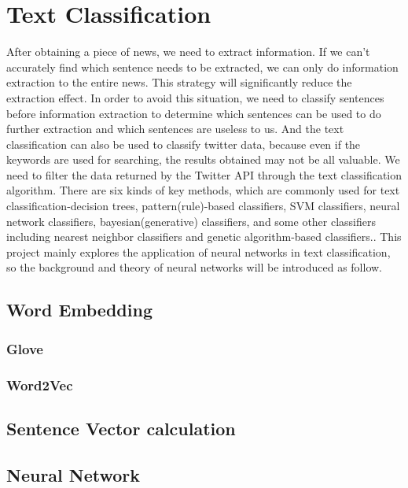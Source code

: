 \section{Text Classification}
\qquad After obtaining a piece of news, we need to extract information. If we can’t accurately find which sentence needs to be extracted, we can only do information extraction to the entire news. This strategy will significantly reduce the extraction effect. In order to avoid this situation, we need to classify sentences before information extraction to determine which sentences can be used to do further extraction and which sentences are useless to us. And the text classification can also be used to classify twitter data, because even if the keywords are used for searching, the results obtained may not be all valuable. We need to filter the data returned by the Twitter API through the text classification algorithm. There are six kinds of key methods, which are commonly used for text classification-decision trees, pattern(rule)-based classifiers, SVM classifiers, neural network classifiers, bayesian(generative) classifiers, and some other classifiers including nearest neighbor classifiers and genetic algorithm-based classifiers.\cite{aggarwal2012survey}. This project mainly explores the application of neural networks in text classification, so the background and theory of neural networks will be introduced as follow.
\subsection{Word Embedding}

\subsubsection{Glove}
\subsubsection{Word2Vec}
\subsection{Sentence Vector calculation}
\subsection{Neural Network}
